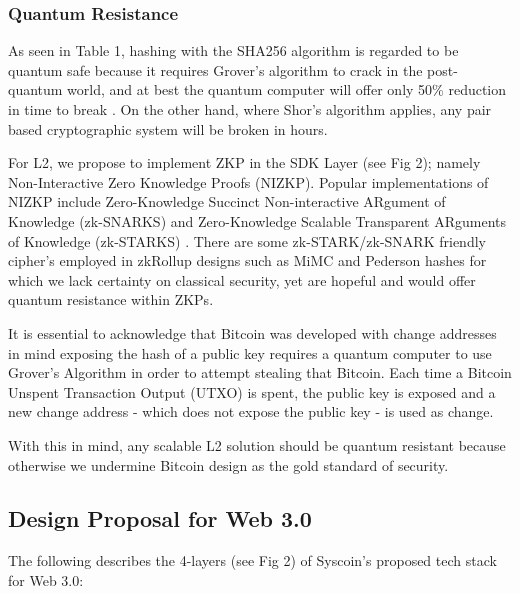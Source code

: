\documentclass[peerreview]{ieeesyscoin}
\begin{document}
\subsubsection{Quantum Resistance}

As seen in Table 1, hashing with the SHA256 algorithm is regarded to be quantum safe because it requires Grover's algorithm to crack in the post-quantum world, and at best the quantum computer will offer only 50\% reduction in time to break \cite{Nai19}. On the other hand, where Shor’s algorithm applies, any pair based cryptographic system will be broken in hours.

For L2, we propose to implement ZKP in the SDK Layer (see Fig 2); namely Non-Interactive Zero Knowledge Proofs (NIZKP). Popular implementations of NIZKP include Zero-Knowledge Succinct Non-interactive ARgument of Knowledge (zk-SNARKS) and Zero-Knowledge Scalable Transparent ARguments of Knowledge (zk-STARKS) \cite{Nas19}. There are some zk-STARK/zk-SNARK friendly cipher’s employed in zkRollup designs such as MiMC and Pederson hashes for which we lack certainty on classical security, yet are hopeful and would offer quantum resistance within ZKPs.

It is essential to acknowledge that Bitcoin was developed with change addresses in mind exposing the hash of a public key requires a quantum computer to use Grover’s Algorithm in order to attempt stealing that Bitcoin. Each time a Bitcoin Unspent Transaction Output (UTXO) is spent, the public key is exposed and a new change address - which does not expose the public key - is used as change.

With this in mind, any scalable L2 solution should be quantum resistant because otherwise we undermine Bitcoin design as the gold standard of security.


\subsection{Design Proposal for Web 3.0}

The following describes the 4-layers (see Fig 2) of Syscoin’s proposed tech stack for Web 3.0:
\end{document}
